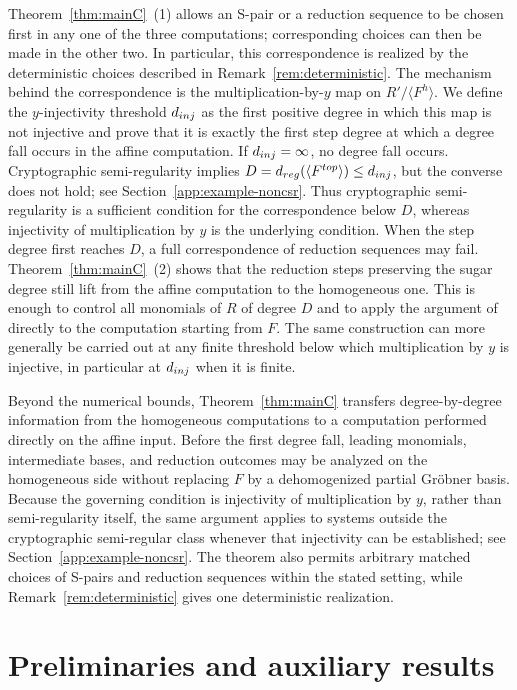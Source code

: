 \documentclass{article}
\theoremstyle{definition}
\theoremstyle{plain}
\theoremstyle{plain}
\theoremstyle{plain}
\theoremstyle{plain}
\numberwithin{equation}{subsection}
\begin{document}
Theorem~\ref{thm:mainC}~{\rm (1)} allows an S-pair or a reduction sequence to be chosen first in any one of the three computations; corresponding choices can then be made in the other two.
In particular, this correspondence is realized by the deterministic choices described in Remark~\ref{rem:deterministic}.
The mechanism behind the correspondence is the multiplication-by-$y$ map on $R'/\langle F^h\rangle$.
We define the $y$-injectivity threshold $d_{\rm inj}$ as the first positive degree in which this map is not injective and prove that it is exactly the first step degree at which a degree fall occurs in the affine computation.
If $d_{\rm inj}=\infty$, no degree fall occurs.
Cryptographic semi-regularity implies $D=d_{\rm reg}(\langle F^{\rm top}\rangle)\leq d_{\rm inj}$, but the converse does not hold; see Section~\ref{app:example-noncsr}.
Thus cryptographic semi-regularity is a sufficient condition for the correspondence below $D$, whereas injectivity of multiplication by $y$ is the underlying condition.
When the step degree first reaches $D$, a full correspondence of reduction sequences may fail.
Theorem~\ref{thm:mainC}~{\rm (2)} shows that the reduction steps preserving the sugar degree still lift from the affine computation to the homogeneous one.
This is enough to control all monomials of $R$ of degree $D$ and to apply the argument of~\cite[Lemma~4]{KY} directly to the computation starting from $F$.
The same construction can more generally be carried out at any finite threshold below which multiplication by $y$ is injective, in particular at $d_{\rm inj}$ when it is finite.

Beyond the numerical bounds, Theorem~\ref{thm:mainC} transfers degree-by-degree information from the homogeneous computations to a computation performed directly on the affine input.
Before the first degree fall, leading monomials, intermediate bases, and reduction outcomes may be analyzed on the homogeneous side without replacing $F$ by a dehomogenized partial Gr\"obner basis.
Because the governing condition is injectivity of multiplication by $y$, rather than semi-regularity itself, the same argument applies to systems outside the cryptographic semi-regular class whenever that injectivity can be established; see Section~\ref{app:example-noncsr}.
The theorem also permits arbitrary matched choices of S-pairs and reduction sequences within the stated setting, while Remark~\ref{rem:deterministic} gives one deterministic realization.

\section{Preliminaries and auxiliary results}\label{sec:pre}
\end{document}

